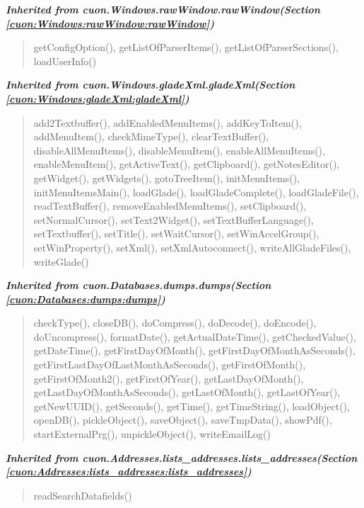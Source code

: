 \large{\textbf{\textit{Inherited from cuon.Windows.rawWindow.rawWindow\textit{(Section \ref{cuon:Windows:rawWindow:rawWindow})}}}}

\begin{quote}
getConfigOption(), getListOfParserItems(), getListOfParserSections(), loadUserInfo()
\end{quote}

\large{\textbf{\textit{Inherited from cuon.Windows.gladeXml.gladeXml\textit{(Section \ref{cuon:Windows:gladeXml:gladeXml})}}}}

\begin{quote}
add2Textbuffer(), addEnabledMenuItems(), addKeyToItem(), addMenuItem(), checkMimeType(), clearTextBuffer(), disableAllMenuItems(), disableMenuItem(), enableAllMenuItems(), enableMenuItem(), getActiveText(), getClipboard(), getNotesEditor(), getWidget(), getWidgets(), gotoTreeItem(), initMenuItems(), initMenuItemsMain(), loadGlade(), loadGladeComplete(), loadGladeFile(), readTextBuffer(), removeEnabledMenuItems(), setClipboard(), setNormalCursor(), setText2Widget(), setTextBufferLanguage(), setTextbuffer(), setTitle(), setWaitCursor(), setWinAccelGroup(), setWinProperty(), setXml(), setXmlAutoconnect(), writeAllGladeFiles(), writeGlade()
\end{quote}

\large{\textbf{\textit{Inherited from cuon.Databases.dumps.dumps\textit{(Section \ref{cuon:Databases:dumps:dumps})}}}}

\begin{quote}
checkType(), closeDB(), doCompress(), doDecode(), doEncode(), doUncompress(), formatDate(), getActualDateTime(), getCheckedValue(), getDateTime(), getFirstDayOfMonth(), getFirstDayOfMonthAsSeconds(), getFirstLastDayOfLastMonthAsSeconds(), getFirstOfMonth(), getFirstOfMonth2(), getFirstOfYear(), getLastDayOfMonth(), getLastDayOfMonthAsSeconds(), getLastOfMonth(), getLastOfYear(), getNewUUID(), getSeconds(), getTime(), getTimeString(), loadObject(), openDB(), pickleObject(), saveObject(), saveTmpData(), showPdf(), startExternalPrg(), unpickleObject(), writeEmailLog()
\end{quote}

\large{\textbf{\textit{Inherited from cuon.Addresses.lists\_addresses.lists\_addresses\textit{(Section \ref{cuon:Addresses:lists_addresses:lists_addresses})}}}}

\begin{quote}
readSearchDatafields()
\end{quote}
